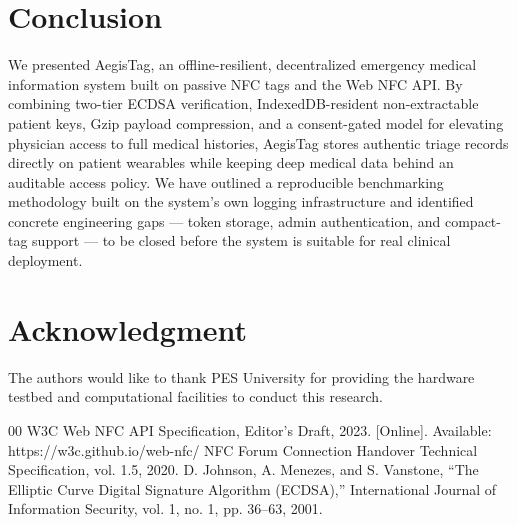 \documentclass[conference]{IEEEtran}
\begin{document}
\section{Conclusion}
We presented AegisTag, an offline-resilient, decentralized emergency medical information system built on passive NFC tags and the Web NFC API. By combining two-tier ECDSA verification, IndexedDB-resident non-extractable patient keys, Gzip payload compression, and a consent-gated model for elevating physician access to full medical histories, AegisTag stores authentic triage records directly on patient wearables while keeping deep medical data behind an auditable access policy. We have outlined a reproducible benchmarking methodology built on the system's own logging infrastructure and identified concrete engineering gaps --- token storage, admin authentication, and compact-tag support --- to be closed before the system is suitable for real clinical deployment.

\section*{Acknowledgment}
The authors would like to thank PES University for providing the hardware testbed and computational facilities to conduct this research.

\begin{thebibliography}{00}
 W3C Web NFC API Specification, Editor's Draft, 2023. [Online]. Available: https://w3c.github.io/web-nfc/
 NFC Forum Connection Handover Technical Specification, vol. 1.5, 2020.
 D. Johnson, A. Menezes, and S. Vanstone, ``The Elliptic Curve Digital Signature Algorithm (ECDSA),'' International Journal of Information Security, vol. 1, no. 1, pp. 36--63, 2001.
\end{thebibliography}
\end{document}

